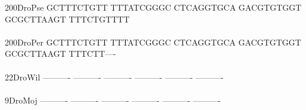 \documentclass[11pt,twoside,reqno,a4paper]{article}
\begin{document}
{200\hspace*{2\charwidth}DroPse	GCTTTCTGTT	TTTATCGGGC	CTCAGGTGCA	GACGTGTGGT	GCGCTTAAGT	TTTCTGTTTT	\\
\hspace*{5\charwidth}\hspace*{7\charwidth}\hspace*{1\charwidth}\hspace*{1\charwidth}\hspace*{1\charwidth}\hspace*{1\charwidth}\hspace*{1\charwidth}\hspace*{1\charwidth}\\
200\hspace*{2\charwidth}DroPer	GCTTTCTGTT	TTTATCGGGC	CTCAGGTGCA	GACGTGTGGT	GCGCTTAAGT	TTTCTT----	\\
\hspace*{5\charwidth}\hspace*{7\charwidth}\hspace*{1\charwidth}\hspace*{1\charwidth}\hspace*{1\charwidth}\hspace*{1\charwidth}\hspace*{1\charwidth}\hspace*{1\charwidth}\\
22\hspace*{3\charwidth}DroWil	----------	----------	----------	----------	----------	----------	\\
\hspace*{5\charwidth}\hspace*{7\charwidth}\hspace*{1\charwidth}\hspace*{1\charwidth}\hspace*{1\charwidth}\hspace*{1\charwidth}\hspace*{1\charwidth}\hspace*{1\charwidth}\\
9\hspace*{4\charwidth}DroMoj	----------	----------	----------	----------	----------	----------	\\
\hspace*{5\charwidth}\hspace*{7\charwidth}\hspace*{1\charwidth}\hspace*{1\charwidth}\hspace*{1\charwidth}\hspace*{1\charwidth}\hspace*{1\charwidth}\hspace*{1\charwidth}\\
}
\end{document}
